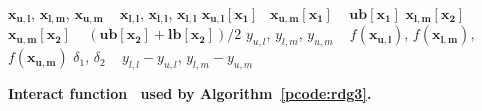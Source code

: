 \begin{algorithm}
	\SetAlgoLined

	$\mathbf{x_{u,l}}$, $\mathbf{x_{l,m}}$, $\mathbf{x_{u,m}}$  \gets~ $\mathbf{x_{l,l}}$, $\mathbf{x_{l,l}}$, $\mathbf{x_{l,l}}$\;
	$\mathbf{x_{u,l}}[\mathbf{x_1}]$ \gets~$\mathbf{x_{u,m}}[\mathbf{x_1}]$ \gets~ $\mathbf{ub}[\mathbf{x_1}]$\;
	$\mathbf{x_{l,m}}[\mathbf{x_2}]$ \gets~ $\mathbf{x_{u,m}}[\mathbf{x_2}]$ \gets~ $(\mathbf{ub}[\mathbf{x_2}] + \mathbf{lb}[\mathbf{x_2}]) / 2$\;
	$y_{u,l}$, $y_{l,m}$, $y_{u,m}$ \gets~ $f(\mathbf{x_{u,l}})$, $f(\mathbf{x_{l,m}})$, $f(\mathbf{x_{u,m}})$\;
	$\delta_1$, $\delta_2$ \gets~ $y_{l,l} - y_{u,l}$, $y_{l,m} - y_{u,m}$\;
	\;

	\caption{\textbf{Interact function~\cite{alg:rdg3} used by Algorithm~\ref{pcode:rdg3}.}}
	\label{pcode:interact}
\end{algorithm}

